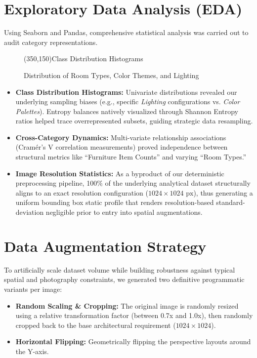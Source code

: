 \documentclass[11pt, a4paper]{article}
\begin{document}
\section{Exploratory Data Analysis (EDA)}
Using Seaborn and Pandas, comprehensive statistical analysis was carried out to audit category representations.

\begin{figure}[h!]
    \centering
    \framebox(350,150){\Large Class Distribution Histograms}
    \caption{Distribution of Room Types, Color Themes, and Lighting}
    \label{fig:eda_histograms}
\end{figure}

\begin{itemize}
    \item \textbf{Class Distribution Histograms:} Univariate distributions revealed our underlying sampling biases (e.g., specific \textit{Lighting} configurations vs. \textit{Color Palettes}). Entropy balances natively visualized through Shannon Entropy ratios helped trace overrepresented subsets, guiding strategic data resampling.
    \item \textbf{Cross-Category Dynamics:} Multi-variate relationship associations (Cramér's V correlation measurements) proved independence between structural metrics like ``Furniture Item Counts'' and varying ``Room Types.'' 
    \item \textbf{Image Resolution Statistics:} As a byproduct of our deterministic preprocessing pipeline, 100\% of the underlying analytical dataset structurally aligns to an exact resolution configuration ($1024 \times 1024 \text{ px}$), thus generating a uniform bounding box static profile that renders resolution-based standard-deviation negligible prior to entry into spatial augmentations.
\end{itemize}

\section{Data Augmentation Strategy}
To artificially scale dataset volume while building robustness against typical spatial and photography constraints, we generated two definitive programmatic variants per image:

\begin{itemize}
    \item \textbf{Random Scaling \& Cropping:} The original image is randomly resized using a relative transformation factor (between 0.7x and 1.0x), then randomly cropped back to the base architectural requirement ($1024 \times 1024$).
    \item \textbf{Horizontal Flipping:} Geometrically flipping the perspective layouts around the Y-axis.
\end{itemize}
\end{document}
